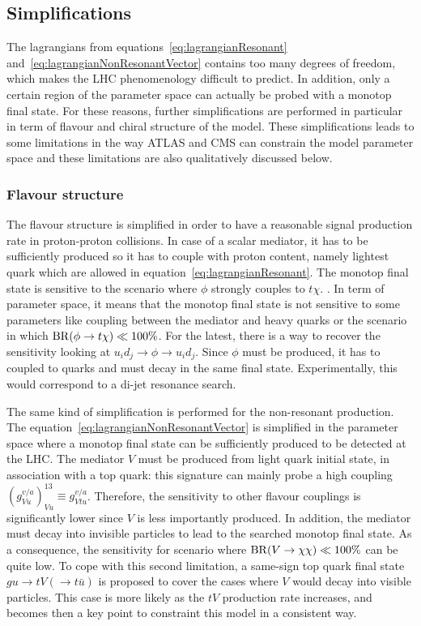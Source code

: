 \subsection{Simplifications}
 
The lagrangians from equations~\eqref{eq:lagrangianResonant} and~\eqref{eq:lagrangianNonResonantVector} contains too many degrees of freedom, 
which makes the LHC phenomenology difficult to predict. In addition, only a certain region of the parameter space can actually be probed with a monotop final state.
For these reasons, further simplifications are performed in particular in term of flavour and chiral structure of the model. 
These simplifications leads to some limitations in the way ATLAS and CMS can constrain the model parameter space and these limitations are also qualitatively discussed below.

\subsubsection{Flavour structure}

The flavour structure is simplified in order to have a reasonable signal production rate in proton-proton collisions.
In case of a scalar mediator, it has to be sufficiently produced so it has to couple with proton content, namely lightest quark which 
are allowed in equation~\eqref{eq:lagrangianResonant}. The monotop final state is sensitive to the scenario where $\phi$ strongly couples to $t\chi$.
. In term of parameter space, it means that the monotop final state is not sensitive
to some parameters like coupling between the mediator and heavy quarks or the scenario in which $\mathrm{BR}({\phi} \to {t\chi}) \ll 100 \%$. For the latest, 
there is a way to recover the sensitivity looking at $u_i d_j \to \phi \to u_i d_j$. Since $\phi$ must be produced, it has to coupled to quarks 
and must decay in the same final state. Experimentally, this would correspond to a di-jet resonance search.

The same kind of simplification is performed for the non-resonant production. The equation~\eqref{eq:lagrangianNonResonantVector} is simplified in the parameter
space where a monotop final state can be sufficiently produced to be detected at the LHC. The mediator $V$ must be produced from light quark initial state, 
in association with a top quark: this signature can mainly probe a high coupling $\left(g^{v/a}_{Vu}\right)^{13}_{Vu} \equiv g^{v/a}_{Vtu}$. Therefore,
the sensitivity to other flavour couplings is significantly lower since $V$ is less importantly produced. In addition, the mediator must decay into invisible particles
to lead to the searched monotop final state. As a consequence, the sensitivity for scenario where $\mathrm{BR}({V} \to {\chi\chi})\ll 100\%$ can be quite low. 
To cope with this second limitation, a same-sign top quark final state $gu \to tV(\to t\bar{u})$ is proposed to cover the cases where $V$ would decay
into visible particles. This case is more likely as the $tV$ production rate increases, and becomes then a key point to constraint this model in a consistent way.

